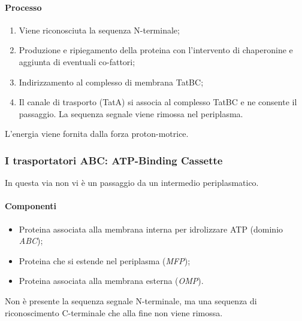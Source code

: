 			\paragraph{Processo}
			\begin{multicols}{2}
				\begin{enumerate}
    					\item Viene riconosciuta la sequenza N-terminale; 
    					\item Produzione e ripiegamento della proteina con l'intervento di chaperonine e aggiunta di eventuali co-fattori; 
    					\item Indirizzamento al complesso di membrana TatBC; 
    					\item Il canale di trasporto  (TatA) si associa al complesso TatBC e ne consente il passaggio. 
						La sequenza segnale viene rimossa nel periplasma. 
				\end{enumerate}
			\end{multicols}
			L'energia viene fornita dalla forza proton-motrice. 

		\subsubsection{I trasportatori ABC: ATP-Binding Cassette}
		In questa via non vi \`e un passaggio da un intermedio periplasmatico. 
		
			\paragraph{Componenti}
			\begin{multicols}{2}
				\begin{itemize}
					\item Proteina associata alla membrana interna per idrolizzare ATP (dominio \emph{ABC}); 
					\item Proteina che si estende nel periplasma (\emph{MFP}); 
					\item Proteina associata alla membrana esterna (\emph{OMP}).
				\end{itemize}
			\end{multicols}
			Non \`e presente la sequenza segnale N-terminale, ma una sequenza di riconoscimento C-terminale che alla fine non viene rimossa. 

